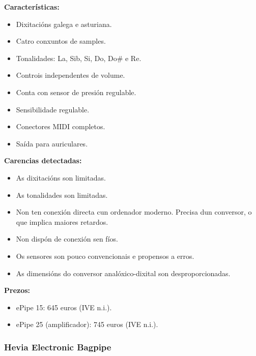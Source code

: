   \textbf{Características:}

  \begin{itemize}
   \item Dixitacións galega e asturiana.
   \item Catro conxuntos de samples.
   \item Tonalidades: La, Sib, Si, Do, Do\# e Re.
   \item Controis independentes de volume.
   \item Conta con sensor de presión regulable.
   \item Sensibilidade regulable.
   \item Conectores MIDI completos.
   \item Saída para auriculares.
  \end{itemize}

  \textbf{Carencias detectadas:}

  \begin{itemize}
   \item As dixitacións son limitadas.
   \item As tonalidades son limitadas.
   \item Non ten conexión directa cun ordenador moderno. Precisa dun conversor,
         o que implica maiores retardos.
   \item Non dispón de conexión sen fíos.
   \item Os sensores son pouco convencionais e propensos a erros.
   \item As dimensións do conversor analóxico-dixital son desproporcionadas.
  \end{itemize}

  \textbf{Prezos:}

  \begin{itemize}
   \item ePipe 15: 645 euros (IVE n.i.).
   \item ePipe 25 (amplificador): 745 euros (IVE n.i.).
  \end{itemize}

  \subsubsection{Hevia Electronic Bagpipe}

